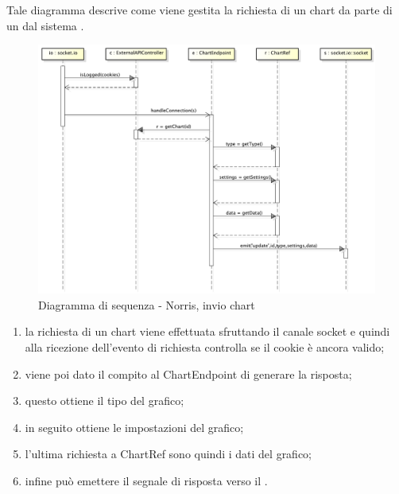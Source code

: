             
        	Tale diagramma descrive come viene gestita la richiesta di un chart da parte di un  dal sistema .
            \begin{figure}[H]
                \centering
                \includegraphics[scale=0.3]{DefinizioneDiProdotto/Pics/NorrisInvioChart}
                \caption{Diagramma di sequenza - Norris, invio chart}
            \end{figure}
            \begin{enumerate}
                \item la richiesta di un chart viene effettuata sfruttando il canale socket e quindi alla ricezione dell'evento di richiesta  controlla se il cookie è ancora valido;
                \item viene poi dato il compito al ChartEndpoint di generare la risposta;
                \item questo ottiene il tipo del grafico;
                \item in seguito ottiene le impostazioni del grafico;
                \item l'ultima richiesta a ChartRef sono quindi i dati del grafico;
                \item infine può emettere il segnale di risposta verso il .
            \end{enumerate}


